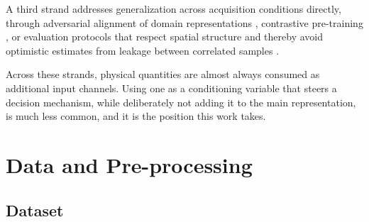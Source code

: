 \documentclass[preprint,12pt,authoryear]{elsarticle}
\begin{document}
A third strand addresses generalization across acquisition conditions directly,
through adversarial alignment of domain representations \citep{ganin2016dann},
contrastive pre-training \citep{chen2020simclr}, or evaluation protocols that
respect spatial structure and thereby avoid optimistic estimates from leakage
between correlated samples \citep{roberts2017crossvalidation,jalayer2025enhancing}.

Across these strands, physical quantities are almost always consumed as
additional input channels. Using one as a conditioning variable that
steers a decision mechanism, while deliberately not adding it to the main
representation, is much less common, and it is the position this work takes.

\section{Data and Pre-processing}
\label{sec:data}

\subsection{Dataset}
\end{document}
